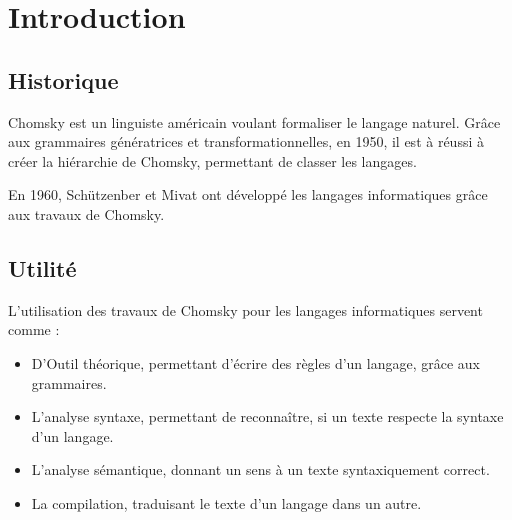 \chapter{Introduction} %
\label{cha:introduction}


\section{Historique} %
\label{sec:historique}

Chomsky est un linguiste américain voulant formaliser le langage naturel. Grâce aux grammaires génératrices et transformationnelles, en 1950, il est à réussi à créer la hiérarchie de Chomsky, permettant de classer les langages.

En 1960, Schützenber et Mivat ont développé les langages informatiques grâce aux travaux de Chomsky.



\section{Utilité} %
\label{sec:utilit_}

L'utilisation des travaux de Chomsky pour les langages informatiques servent comme :
\begin{itemize}
	\item D'Outil théorique, permettant d'écrire des règles d'un langage, grâce aux grammaires.
	\item L'analyse syntaxe, permettant de reconnaître, si un texte respecte la syntaxe d'un langage.
	\item L'analyse sémantique, donnant un sens à un texte syntaxiquement correct.
	\item La compilation, traduisant le texte d'un langage dans un autre.
\end{itemize}



